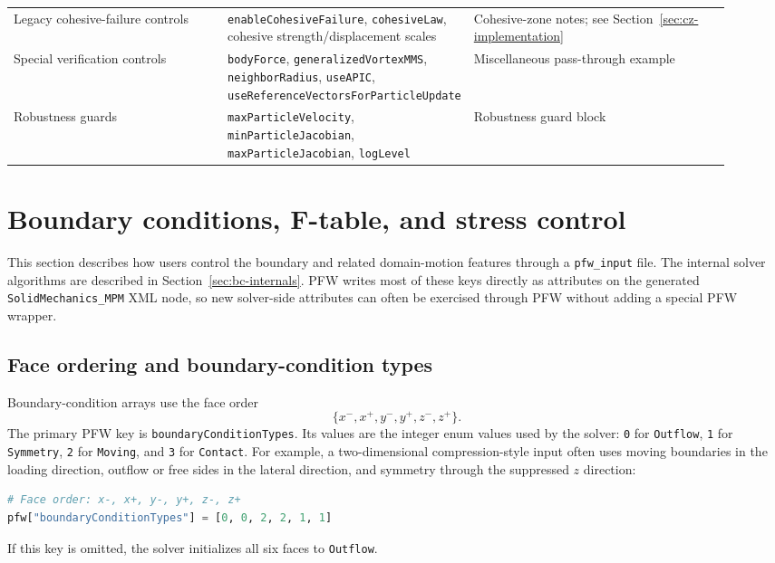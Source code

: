 {\begin{longtable}{@{}p{0.30\linewidth}p{0.26\linewidth}p{0.36\linewidth}@{}}
Legacy cohesive-failure controls & \texttt{enableCohesiveFailure}, \texttt{cohesiveLaw}, cohesive strength/displacement scales & Cohesive-zone notes; see Section~\ref{sec:cz-implementation}\\
Special verification controls & \texttt{bodyForce}, \texttt{generalizedVortexMMS}, \texttt{neighborRadius}, \texttt{useAPIC}, \texttt{useReferenceVectorsForParticleUpdate} & Miscellaneous pass-through example\\
Robustness guards & \texttt{maxParticleVelocity}, \texttt{minParticleJacobian}, \texttt{maxParticleJacobian}, \texttt{logLevel} & Robustness guard block\\
\end{longtable}}


\section{Boundary conditions, F-table, and stress control}
\label{sec:pfw-boundary-controls}

This section describes how users control the boundary and related domain-motion features through a \texttt{pfw\_input} file.  The internal solver algorithms are described in Section~\ref{sec:bc-internals}.  PFW writes most of these keys directly as attributes on the generated \texttt{SolidMechanics\_MPM} XML node, so new solver-side attributes can often be exercised through PFW without adding a special PFW wrapper.

\subsection{Face ordering and boundary-condition types}

Boundary-condition arrays use the face order
\begin{equation}
  \{x^-,x^+,y^-,y^+,z^-,z^+\}.
\end{equation}
The primary PFW key is \texttt{boundaryConditionTypes}.  Its values are the integer enum values used by the solver: \texttt{0} for \texttt{Outflow}, \texttt{1} for \texttt{Symmetry}, \texttt{2} for \texttt{Moving}, and \texttt{3} for \texttt{Contact}.  For example, a two-dimensional compression-style input often uses moving boundaries in the loading direction, outflow or free sides in the lateral direction, and symmetry through the suppressed $z$ direction:
\begin{lstlisting}[language=Python,caption={PFW boundary face order and type selection.}]
# Face order: x-, x+, y-, y+, z-, z+
pfw["boundaryConditionTypes"] = [0, 0, 2, 2, 1, 1]
\end{lstlisting}
If this key is omitted, the solver initializes all six faces to \texttt{Outflow}.

